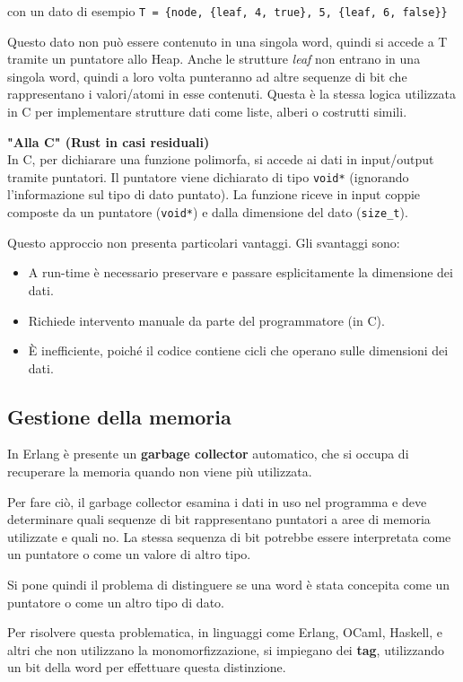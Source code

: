 \documentclass{article}
\begin{document}
con un dato di esempio \texttt{T = \{node, \{leaf, 4, true\}, 5, \{leaf, 6, false\}\}}

Questo dato non può essere contenuto in una singola word, quindi si accede a T tramite un puntatore allo Heap. Anche le strutture \textit{leaf} non entrano in una singola word, quindi a loro volta punteranno ad altre sequenze di bit che rappresentano i valori/atomi in esse contenuti. Questa è la stessa logica utilizzata in C per implementare strutture dati come liste, alberi o costrutti simili.\vspace{14pt}

\textbf{"Alla C" (Rust in casi residuali)}\\
In C, per dichiarare una funzione polimorfa, si accede ai dati in input/output tramite puntatori. Il puntatore viene dichiarato di tipo \texttt{void*} (ignorando l'informazione sul tipo di dato puntato). La funzione riceve in input coppie composte da un puntatore (\texttt{void*}) e dalla dimensione del dato (\texttt{size\_t}).

Questo approccio non presenta particolari vantaggi. Gli svantaggi sono:
\begin{itemize}
    \item A run-time è necessario preservare e passare esplicitamente la dimensione dei dati.
    \item Richiede intervento manuale da parte del programmatore (in C).
    \item È inefficiente, poiché il codice contiene cicli che operano sulle dimensioni dei dati.
\end{itemize}

\subsection*{Gestione della memoria}
In Erlang è presente un \textbf{garbage collector} automatico, che si occupa di recuperare la memoria quando non viene più utilizzata.

Per fare ciò, il garbage collector esamina i dati in uso nel programma e deve determinare quali sequenze di bit rappresentano puntatori a aree di memoria utilizzate e quali no. La stessa sequenza di bit potrebbe essere interpretata come un puntatore o come un valore di altro tipo.

Si pone quindi il problema di distinguere se una word è stata concepita come un puntatore o come un altro tipo di dato.

Per risolvere questa problematica, in linguaggi come Erlang, OCaml, Haskell, e altri che non utilizzano la monomorfizzazione, si impiegano dei \textbf{tag}, utilizzando un bit della word per effettuare questa distinzione.
\end{document}
